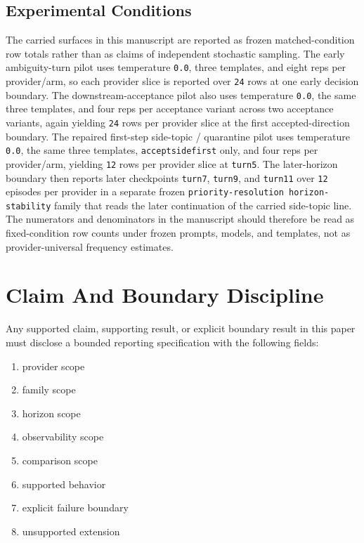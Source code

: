 \documentclass[11pt]{article}
\renewcommand{\_}{\textunderscore\hspace{0pt}}
\begin{document}
\subsection{Experimental Conditions}

The carried surfaces in this manuscript are reported as frozen matched-condition
row totals rather than as claims of independent stochastic sampling. The early
ambiguity-turn pilot uses temperature \texttt{0.0}, three templates, and eight
reps per provider/arm, so each provider slice is reported over \texttt{24}
rows at one early decision boundary. The downstream-acceptance pilot also uses
temperature \texttt{0.0}, the same three templates, and four reps per
acceptance variant across two acceptance variants, again yielding \texttt{24}
rows per provider slice at the first accepted-direction boundary. The repaired
first-step side-topic / quarantine pilot uses temperature \texttt{0.0}, the
same three templates, \texttt{accept\_side\_first} only, and four reps per
provider/arm, yielding \texttt{12} rows per provider slice at \texttt{turn5}.
The later-horizon boundary then reports later checkpoints \texttt{turn7},
\texttt{turn9}, and \texttt{turn11} over \texttt{12} episodes per provider in
a separate frozen \texttt{priority-resolution horizon-stability} family that
reads the later continuation of the carried side-topic line. The numerators
and denominators in the manuscript should therefore be read as fixed-condition
row counts under frozen prompts, models, and templates, not as
provider-universal frequency estimates.

\section{Claim And Boundary Discipline}

Any supported claim, supporting result, or explicit boundary result in this
paper must disclose a bounded reporting specification with the following
fields:

\begin{enumerate}
\item provider scope
\item family scope
\item horizon scope
\item observability scope
\item comparison scope
\item supported behavior
\item explicit failure boundary
\item unsupported extension
\end{enumerate}
\end{document}
